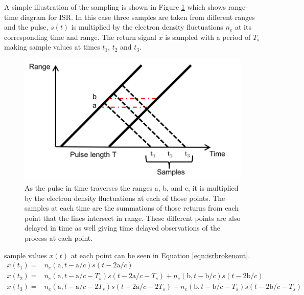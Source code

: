 A simple illustration of the sampling is shown in Figure \ref{fig:isrfigure} which shows range-time diagram for ISR. In this case three samples are taken from different ranges and the pulse, $s(t)$ is multiplied by the electron density fluctuations $n_e$ at its corresponding time and range. The return signal $x$ is sampled with a period of $T_s$  making sample values at times $t_1$, $t_2$ and $t_3$. 
\begin{figure}[htb]
\centering
\includegraphics[width=5in]{ISRpicture}
\caption{As the pulse in time traverses the ranges a, b, and c, it is multiplied by the electron density fluctuations at each of those points. The samples at each time are the summations of those returns from each point that the lines intersect in range. These different points are also delayed in time as well giving time delayed observations of the process at each point. }
\label{fig:isrfigure}
\end{figure}
sample values $x(t)$ at each point can be seen in Equation \ref{eqn:isrbrokenout}.
\begin{equation}
\label{eqn:isrbrokenout}
\begin{split}
 x(t_1)=& n_e(\text{a},t-\text{a}/c)s(t-2\text{a}/c) \\ 
 x(t_2)=& n_e(\text{a},t-\text{a}/c-T_s)s(t-2\text{a}/c-T_s) +  n_e(\text{b},t-\text{b}/c)s(t-2\text{b}/c)\\
 x(t_3)=& n_e(\text{a},t-\text{a}/c-2T_s)s(t-2\text{a}/c-2T_s) +  n_e(\text{b},t-\text{b}/c-T_s)s(t-2\text{b}/c-T_s) \end{split}
\end{equation}

